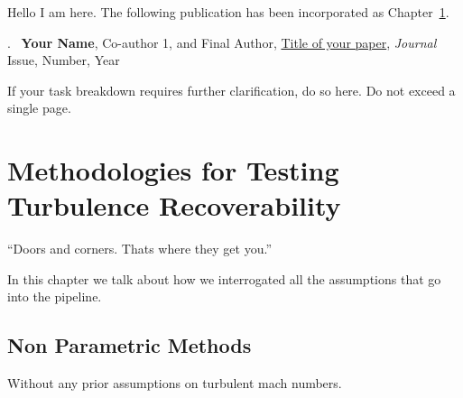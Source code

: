 \cleartoevenpage
\pagestyle{empty}	

\noindent
Hello I am here. The following publication has been incorporated as Chapter~\ref{Chap:assumptionsInterrogationsMethod}.

.~\cite{DumyCitationKey} \textbf{Your Name}, Co-author 1, and Final Author, \href{linktoyourpaper}{Title of your paper}, \textit{Journal} Issue, Number, Year

If your task breakdown requires further clarification, do so here. Do not exceed a single page.


\chapter[Abbreviated title]{Methodologies for Testing Turbulence Recoverability}\label{Chap:assumptionsInterrogationsMethod}

\epigraph{``Doors and corners. Thats where they get you.''}{}

\pagestyle{headings}

In this chapter we talk about how we interrogated all the assumptions that go into the pipeline.



\section{Non Parametric Methods}\label{Chap:interrogationsNPMethods}	%

Without any prior assumptions on turbulent mach numbers.
